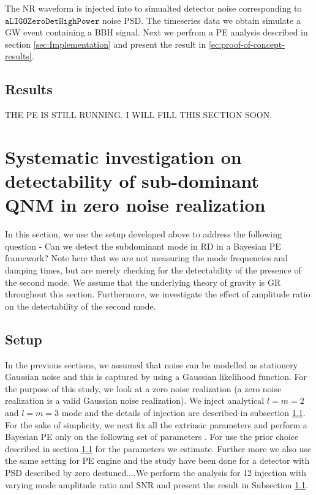 The NR waveform is injected into to simualted detector noise corresponding to $\texttt{aLIGOZeroDetHighPower}$ noise PSD. The timeseries data we obtain simulate a GW event containing a BBH signal. Next we perfrom a PE analysis described in section \ref{sec:Implementation} and present the result in \ref{ec:proof-of-concept-results}.

\subsection{Results}
\label{sec:proof-of-concept-results}
THE PE IS STILL RUNNING. I WILL FILL THIS SECTION SOON. 


\section{Systematic investigation on detectability of sub-dominant QNM in zero noise realization}

In this section, we use the setup developed above to address the following question - Can we detect the subdominant mode in RD in a Bayesian PE framework? Note here that we are not measuring the mode frequencies and damping times, but are merely checking for the detectability of the presence of the second mode. We assume that the underlying theory of gravity is GR throughout this section. Furthermore, we investigate the effect of amplitude ratio on the detectability of the second mode. 

\subsection{Setup}
In the previous sections, we assumed that noise can be modelled as stationery Gaussian noise and this is captured by using a Gaussian likelihood function. For the purpose of this study, we look at a zero noise realization (a zero noise realization is a valid Gaussian noise realization). We inject analytical $l=m=2$ and $l=m=3$ mode and the details of injection are described in subsection \ref{}. For the sake of simplicity, we next fix all the extrinsic parameters and perform a Bayesian PE only on the following set of parameters ${}$. For use the prior choice described in section \ref{} for the parameters we estimate. Further more we also use the same setting for PE engine and the study have been done for a detector with PSD described by zero destuned....We perform the analysis for 12 injection with varying mode amplitude ratio and SNR and present the result in Subsection \ref{}.

